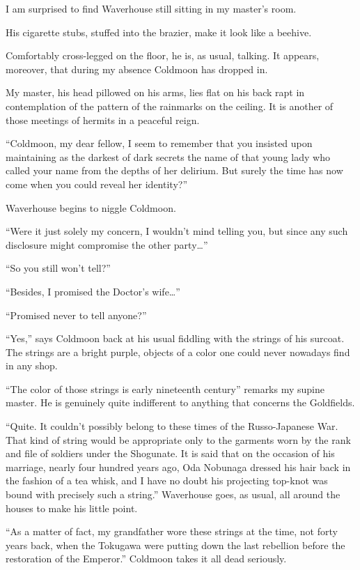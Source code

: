 \documentclass{book}
\begin{document}
I am surprised to find Waverhouse still sitting in my master's room.

His cigarette stubs, stuffed into the brazier, make it look like a
beehive.

Comfortably cross-legged on the floor, he is, as usual, talking. It
appears, moreover, that during my absence Coldmoon has dropped in.

My master, his head pillowed on his arms, lies flat on his back rapt in
contemplation of the pattern of the rainmarks on the ceiling. It is
another of those meetings of hermits in a peaceful reign.

``Coldmoon, my dear fellow, I seem to remember that you insisted upon
maintaining as the darkest of dark secrets the name of that young lady
who called your name from the depths of her delirium. But surely the
time has now come when you could reveal her identity?''

Waverhouse begins to niggle Coldmoon.

``Were it just solely my concern, I wouldn't mind telling you, but since
any such disclosure might compromise the other party\ldots{}''

``So you still won't tell?''

``Besides, I promised the Doctor's wife\ldots{}''

``Promised never to tell anyone?''

``Yes,'' says Coldmoon back at his usual fiddling with the strings of
his surcoat. The strings are a bright purple, objects of a color one
could never nowadays find in any shop.

``The color of those strings is early nineteenth century'' remarks my
supine master. He is genuinely quite indifferent to anything that
concerns the Goldfields.

``Quite. It couldn't possibly belong to these times of the
Russo-Japanese War. That kind of string would be appropriate only to the
garments worn by the rank and file of soldiers under the Shogunate. It
is said that on the occasion of his marriage, nearly four hundred years
ago, Oda Nobunaga dressed his hair back in the fashion of a tea whisk,
and I have no doubt his projecting top-knot was bound with precisely
such a string.'' Waverhouse goes, as usual, all around the houses to
make his little point.

``As a matter of fact, my grandfather wore these strings at the time,
not forty years back, when the Tokugawa were putting down the last
rebellion before the restoration of the Emperor.'' Coldmoon takes it all
dead seriously.
\end{document}
